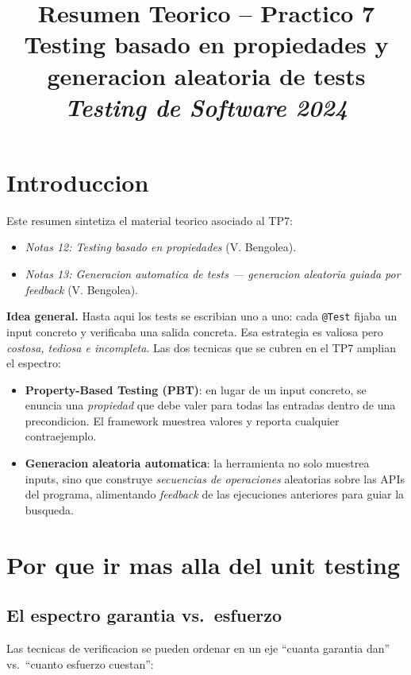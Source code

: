 \documentclass[12pt,a4paper]{article}
\title{\textbf{Resumen Teorico -- Practico 7}\\
Testing basado en propiedades y generacion aleatoria de tests\\
\textit{Testing de Software 2024}}
\author{}
\date{}
\begin{document}
\maketitle
\tableofcontents
\newpage

\section*{Introduccion}

Este resumen sintetiza el material teorico asociado al TP7:

\begin{itemize}
  \item \textit{Notas 12: Testing basado en propiedades} (V. Bengolea).
  \item \textit{Notas 13: Generacion automatica de tests --- generacion aleatoria guiada por
  feedback} (V. Bengolea).
\end{itemize}

\textbf{Idea general.} Hasta aqui los tests se escribian uno a uno: cada \texttt{@Test}
fijaba un input concreto y verificaba una salida concreta. Esa estrategia es valiosa pero
\emph{costosa, tediosa e incompleta}. Las dos tecnicas que se cubren en el TP7 amplian el
espectro:

\begin{itemize}
  \item \textbf{Property-Based Testing (PBT)}: en lugar de un input concreto, se enuncia una
  \emph{propiedad} que debe valer para todas las entradas dentro de una precondicion. El
  framework muestrea valores y reporta cualquier contraejemplo.
  \item \textbf{Generacion aleatoria automatica}: la herramienta no solo muestrea inputs, sino
  que construye \emph{secuencias de operaciones} aleatorias sobre las APIs del programa,
  alimentando \emph{feedback} de las ejecuciones anteriores para guiar la busqueda.
\end{itemize}

\section{Por que ir mas alla del unit testing}

\subsection{El espectro garantia vs.\ esfuerzo}

Las tecnicas de verificacion se pueden ordenar en un eje ``cuanta garantia dan'' vs.\ ``cuanto
esfuerzo cuestan'':
\end{document}
